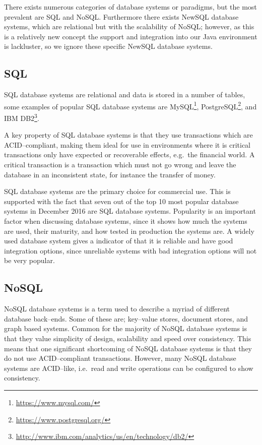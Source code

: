 \bigskip
There exists numerous categories of database systems or paradigms, but the most prevalent are SQL and NoSQL.
Furthermore there exists NewSQL database systems, which are relational but with the scalability of NoSQL;
however, as this is a relatively new concept the support and integration into our Java environment is lackluster, so we ignore these specific NewSQL database systems.

\subsection{SQL}

SQL database systems are relational and data is stored in a number of tables, some examples of popular SQL database systems are MySQL\footnote{\url{https://www.mysql.com/}}, PostgreSQL\footnote{\url{https://www.postgresql.org/}}, and IBM DB2\footnote{\url{http://www.ibm.com/analytics/us/en/technology/db2/}}.\cite{DB_RANKINGS}

A key property of SQL database systems is that they use transactions which are ACID--compliant\cite{Haerder:1983:PTD:289.291}, making them ideal for use in environments where it is critical transactions only have expected or recoverable effects, e.g.~the financial world.
A critical transaction is a transaction which must not go wrong and leave the database in an inconsistent state, for instance the transfer of money.

SQL database systems are the primary choice for commercial use\cite{dbs_concepts}.
This is supported with the fact that seven out of the top 10 most popular database systems in December 2016 are SQL database systems\cite{DB_RANKINGS}.
Popularity is an important factor when discussing database systems, since it shows how much the systems are used, their maturity, and how tested in production the systems are.
A widely used database system gives a indicator of that it is reliable and have good integration options,
since unreliable systems with bad integration options will not be very popular. 

\subsection{NoSQL}
NoSQL database systems is a term used to describe a myriad of different database back--ends.
Some of these are; key--value stores, document stores, and graph based systems.
Common for the majority of NoSQL database systems is that they value simplicity of design, scalability and speed over consistency.
This means that one significant shortcoming of NoSQL database systems is that they do not use ACID--compliant transactions.
However, many NoSQL database systems are ACID--like, i.e.~read and write operations can be configured to show consistency.

